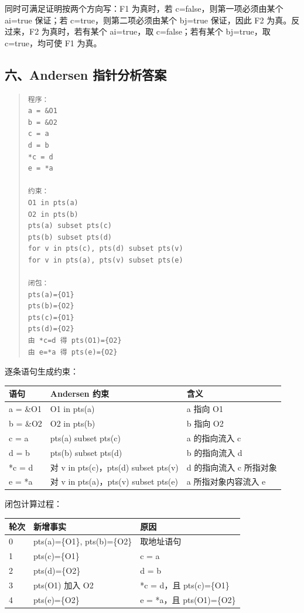 \documentclass[UTF8,zihao=-4]{ctexart}
\begin{document}
同时可满足证明按两个方向写：F1 为真时，若 c=false，则第一项必须由某个 ai=true 保证；若 c=true，则第二项必须由某个 bj=true 保证，因此 F2 为真。反过来，F2 为真时，若有某个 ai=true，取 c=false；若有某个 bj=true，取 c=true，均可使 F1 为真。



\subsection{六、Andersen 指针分析答案}


\begin{quote}
\footnotesize
\begin{verbatim}
程序：
a = &O1
b = &O2
c = a
d = b
*c = d
e = *a

约束：
O1 in pts(a)
O2 in pts(b)
pts(a) subset pts(c)
pts(b) subset pts(d)
for v in pts(c), pts(d) subset pts(v)
for v in pts(a), pts(v) subset pts(e)

闭包：
pts(a)={O1}
pts(b)={O2}
pts(c)={O1}
pts(d)={O2}
由 *c=d 得 pts(O1)={O2}
由 e=*a 得 pts(e)={O2}
\end{verbatim}
\end{quote}

逐条语句生成约束：

\begin{center}
\footnotesize
\begin{tabular}{lll}
\hline
语句 & Andersen 约束 & 含义 \\
\hline
a = \&O1 & O1 in pts(a) & a 指向 O1 \\
b = \&O2 & O2 in pts(b) & b 指向 O2 \\
c = a & pts(a) subset pts(c) & a 的指向流入 c \\
d = b & pts(b) subset pts(d) & b 的指向流入 d \\
*c = d & 对 v in pts(c)，pts(d) subset pts(v) & d 的指向流入 c 所指对象 \\
e = *a & 对 v in pts(a)，pts(v) subset pts(e) & a 所指对象内容流入 e \\
\hline
\end{tabular}
\end{center}

闭包计算过程：

\begin{center}
\footnotesize
\begin{tabular}{lll}
\hline
轮次 & 新增事实 & 原因 \\
\hline
0 & pts(a)=\{O1\}, pts(b)=\{O2\} & 取地址语句 \\
1 & pts(c)=\{O1\} & c = a \\
2 & pts(d)=\{O2\} & d = b \\
3 & pts(O1) 加入 O2 & *c = d，且 pts(c)=\{O1\} \\
4 & pts(e)=\{O2\} & e = *a，且 pts(O1)=\{O2\} \\
\hline
\end{tabular}
\end{center}
\end{document}
